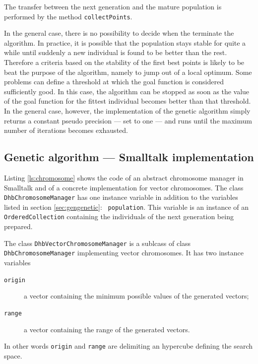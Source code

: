 \documentclass[twoside]{book}
\begin{document}
\noindent The transfer between the next generation and the mature
population is performed by the method {\tt collectPoints}.

In the general case, there is no possibility to decide when the
terminate the algorithm. In practice, it is possible that the
population stays stable for quite a while until suddenly a new
individual is found to be better than the rest. Therefore a
criteria based on the stability of the first best points is likely
to be beat the purpose of the algorithm, namely to jump out of a
local optimum. Some problems can define a threshold at which the
goal function is considered sufficiently good. In this case, the
algorithm can be stopped as soon as the value of the goal function
for the fittest individual becomes better than that threshold. In
the general case, however, the implementation of the genetic
algorithm simply returns a constant pseudo precision
--- set to one --- and runs until the maximum number of iterations
becomes exhausted.

\subsection{Genetic algorithm --- Smalltalk implementation}
 Listing \ref{ls:chromosome}
shows the code of an abstract chromosome manager in Smalltalk and
of a concrete implementation for vector chromosomes. The class
{\tt DhbChromosomeManager} has one instance variable in addition
to the variables listed in section \ref{sec:gengenetic}: {\tt
population}. This variable is an instance of an {\tt
OrderedCollection} containing the individuals of the next
generation being prepared.

The class {\tt DhbVectorChromosomeManager} is a sublcass of class
{\tt DhbChromosomeManager} implementing vector chromosomes. It has
two instance variables
\begin{description}
  \item[\tt origin] a vector containing the minimum possible
  values of the generated vectors;
  \item[\tt range] a vector containing the range of the generated
  vectors.
\end{description}
In other words {\tt origin} and {\tt range} are delimiting an
hypercube defining the search space.
\end{document}
